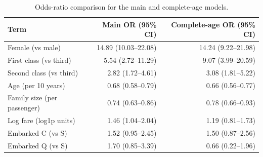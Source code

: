 \begin{table}[htbp]
\centering
\caption{Odds-ratio comparison for the main and complete-age models.}
\label{tab:age-sensitivity}
\small
\begin{tabular}{lrr}
\toprule
Term & Main OR (95\% CI) & Complete-age OR (95\% CI) \\
\midrule
Female (vs male) & 14.89 (10.03--22.08) & 14.24 (9.22--21.98) \\
First class (vs third) & 5.54 (2.72--11.29) & 9.07 (3.99--20.59) \\
Second class (vs third) & 2.82 (1.72--4.61) & 3.08 (1.81--5.22) \\
Age (per 10 years) & 0.68 (0.58--0.79) & 0.66 (0.56--0.77) \\
Family size (per passenger) & 0.74 (0.63--0.86) & 0.78 (0.66--0.93) \\
Log fare (log1p units) & 1.46 (1.04--2.04) & 1.19 (0.81--1.73) \\
Embarked C (vs S) & 1.52 (0.95--2.45) & 1.50 (0.87--2.56) \\
Embarked Q (vs S) & 1.70 (0.85--3.39) & 0.66 (0.22--1.96) \\
\bottomrule
\end{tabular}
\end{table}
